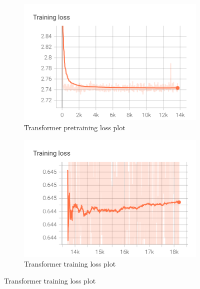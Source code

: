 \begin{figure}[ht]
	\centering
	\begin{subfigure}[b]{0.49\textwidth}
		\centering
		\includegraphics[width=\linewidth]{figures/pretrainingLossPlot.png}
		\caption{Transformer pretraining loss plot}
		\label{pretrainingLossPlot}
	\end{subfigure}
	\hfill
	\begin{subfigure}[b]{0.49\textwidth}
		\centering
		\includegraphics[width=\linewidth]{figures/trainingLossPlot.png}
		\caption{Transformer training loss plot}
		\label{trainingLossPlot}
	\end{subfigure}
\end{figure}


